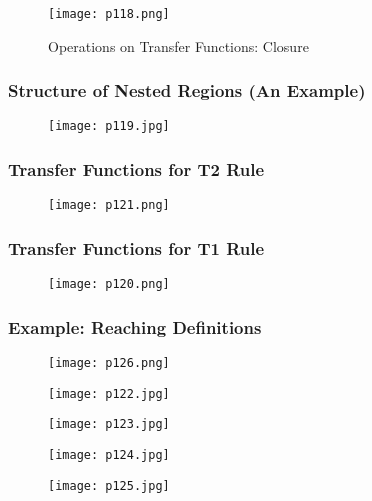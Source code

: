 \begin{figure}[H]
	\centering
	\texttt{[image: p118.png]}
	\caption{Operations on Transfer Functions: Closure}
	\label{fig:p118}
\end{figure}



\subsubsection{Structure of Nested Regions (An Example)}

\begin{figure}[H]
	\centering
	\texttt{[image: p119.jpg]}
	\caption{}
	\label{fig:p119}
\end{figure}


\subsubsection{Transfer Functions for T2 Rule}

\begin{figure}[H]
	\centering
	\texttt{[image: p121.png]}
	\caption{}
	\label{fig:p121}
\end{figure}



\subsubsection{Transfer Functions for T1 Rule}


\begin{figure}[H]
	\centering
	\texttt{[image: p120.png]}
	\caption{}
	\label{fig:p120}
\end{figure}


\subsubsection{Example: Reaching Definitions}

\begin{figure}[H]
	\centering
	\texttt{[image: p126.png]}
	\caption{}
	\label{fig:p126}
\end{figure}



\begin{figure}[H]
	\centering
	\texttt{[image: p122.jpg]}
	\caption{}
	\label{fig:p122}
\end{figure}

\begin{figure}[H]
	\centering
	\texttt{[image: p123.jpg]}
	\caption{}
	\label{fig:p123}
\end{figure}
\begin{figure}[H]
	\centering
	\texttt{[image: p124.jpg]}
	\caption{}
	\label{fig:p124}
\end{figure}
\begin{figure}[H]
	\centering
	\texttt{[image: p125.jpg]}
	\caption{}
	\label{fig:p125}
\end{figure}
